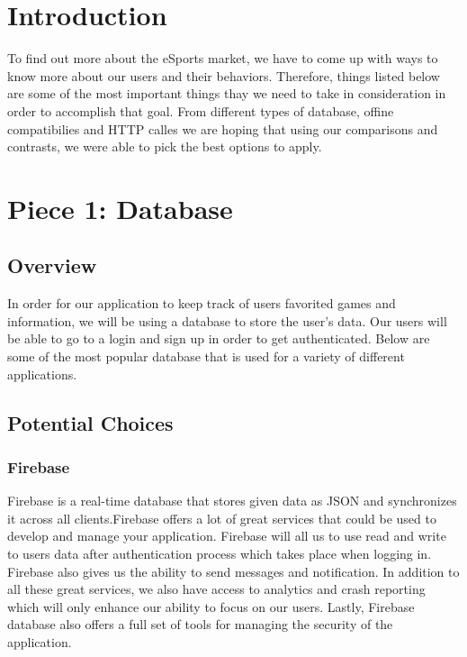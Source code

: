 \documentclass[onecolumn, draftclsnofoot,10pt, compsoc]{IEEEtran}
\begin{document}
\newpage
{}
\tableofcontents
\clearpage

\section{Introduction}
To find out more about the eSports market, we have to come up with ways to know more about our users and their behaviors. Therefore, things listed below are some of the most important things thay we need to take in consideration in order to accomplish that goal. From different types of database, offine compatibilies and HTTP calles we are hoping that using our comparisons and contrasts, we were able to pick the best options to apply. 

\section{Piece 1: Database}
\subsection{Overview}
\par In order for our application to keep track of users favorited games and information, we will be using a database to store the user's data. Our users will be able to go to a login and sign up in order to get authenticated. Below are some of the most popular database that is used for a variety of different applications. 
\subsection{Potential Choices}

\subsubsection{Firebase\cite{Firebase}}
Firebase is a real-time database that stores given data as JSON and synchronizes it across all clients.Firebase offers a lot of great services that could be used to develop and manage your application. Firebase will all us to use read and write to users data after authentication process which takes place when logging in. Firebase also gives us the ability to send messages and notification. In addition to all these great services, we also have access to analytics and crash reporting which will only enhance our ability to focus on our users. Lastly, Firebase database also offers a full set of tools for managing the security of the application.
\end{document}
